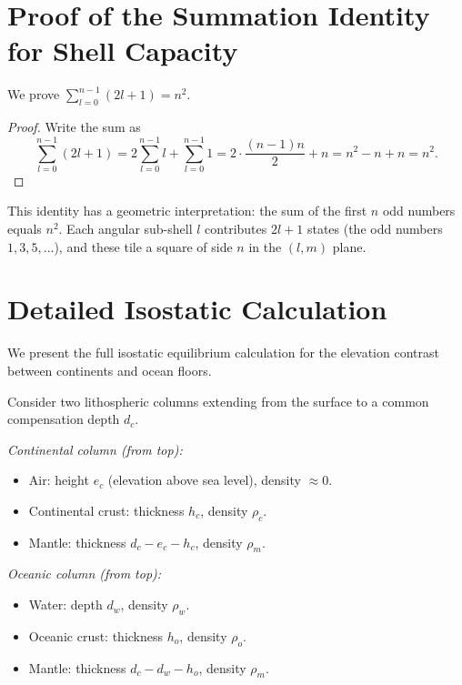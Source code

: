 \documentclass[10pt,twocolumn]{article}
\theoremstyle{definition}
\theoremstyle{remark}
\begin{document}
\appendix

\section{Proof of the Summation Identity for Shell Capacity}
\label{app:sum}

We prove $\sum_{l=0}^{n-1}(2l+1)=n^2$.

\begin{proof}
Write the sum as
\begin{equation}
  \sum_{l=0}^{n-1}(2l+1)
  = 2\sum_{l=0}^{n-1}l + \sum_{l=0}^{n-1}1
  = 2\cdot\frac{(n-1)n}{2} + n
  = n^2-n+n = n^2.
\end{equation}
\end{proof}

This identity has a geometric interpretation: the sum of the
first $n$ odd numbers equals $n^2$.  Each angular sub-shell
$l$ contributes $2l+1$ states (the odd numbers $1,3,5,\dots$),
and these tile a square of side $n$ in the $(l,m)$ plane.

\section{Detailed Isostatic Calculation}\label{app:isostasy}

We present the full isostatic equilibrium calculation for the
elevation contrast between continents and ocean floors.

Consider two lithospheric columns extending from the surface to
a common compensation depth $d_c$.

\emph{Continental column (from top):}
\begin{itemize}[leftmargin=*,itemsep=1pt]
\item Air: height $e_c$ (elevation above sea level), density $\approx 0$.
\item Continental crust: thickness $h_c$, density $\rho_c$.
\item Mantle: thickness $d_c - e_c - h_c$, density $\rho_m$.
\end{itemize}

\emph{Oceanic column (from top):}
\begin{itemize}[leftmargin=*,itemsep=1pt]
\item Water: depth $d_w$, density $\rho_w$.
\item Oceanic crust: thickness $h_o$, density $\rho_o$.
\item Mantle: thickness $d_c - d_w - h_o$, density $\rho_m$.
\end{itemize}
\end{document}
